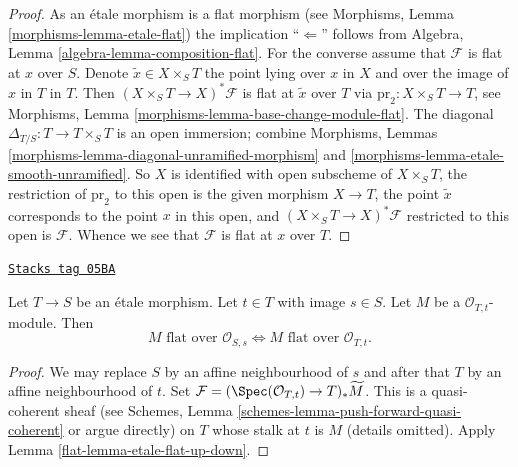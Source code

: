 \begin{proof}
As an \'etale morphism is a flat morphism (see
Morphisms, Lemma \ref{morphisms-lemma-etale-flat})
the implication ``$\Leftarrow$'' follows from
Algebra, Lemma \ref{algebra-lemma-composition-flat}.
For the converse assume that $\mathcal{F}$ is flat at $x$ over $S$.
Denote $\tilde x \in X \times_S T$ the point lying over $x$ in $X$
and over the image of $x$ in $T$ in $T$.
Then $(X \times_S T \to X)^*\mathcal{F}$ is flat at $\tilde x$ over $T$
via $\text{pr}_2 : X \times_S T \to T$, see
Morphisms, Lemma \ref{morphisms-lemma-base-change-module-flat}.
The diagonal $\Delta_{T/S} : T \to T \times_S T$ is an open immersion;
combine
Morphisms, Lemmas \ref{morphisms-lemma-diagonal-unramified-morphism} and
\ref{morphisms-lemma-etale-smooth-unramified}.
So $X$ is identified with open subscheme of $X \times_S T$,
the restriction of $\text{pr}_2$ to this open is the given morphism $X \to T$,
the point $\tilde x$ corresponds to the point $x$ in this open, and
$(X \times_S T \to X)^*\mathcal{F}$ restricted to this open is $\mathcal{F}$.
Whence we see that $\mathcal{F}$ is flat at $x$ over $T$.
\end{proof}

\begin{lemma}
\label{flat-lemma-etale-flat-up-down-local-ring}
\href{https://stacks.math.columbia.edu/tag/05BA}{\texttt{Stacks tag 05BA}}

Let $T \to S$ be an \'etale morphism. Let $t \in T$ with image $s \in S$.
Let $M$ be a $\mathcal{O}_{T, t}$-module. Then
$$
M\text{ flat over }\mathcal{O}_{S, s}
\Leftrightarrow
M\text{ flat over }\mathcal{O}_{T, t}.
$$
\end{lemma}

\begin{proof}

We may replace $S$ by an affine neighbourhood of $s$ and after that
$T$ by an affine neighbourhood of $t$.
Set $\mathcal{F} = (\Spec(\mathcal{O}_{T, t}) \to T)_*\widetilde M$.
This is a quasi-coherent sheaf (see
Schemes, Lemma \ref{schemes-lemma-push-forward-quasi-coherent}
or argue directly)
on $T$ whose stalk at $t$ is $M$ (details omitted).
Apply
Lemma \ref{flat-lemma-etale-flat-up-down}.
\end{proof}


